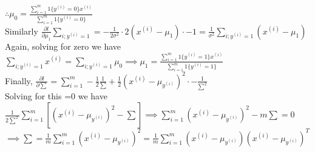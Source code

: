 \begin{answer}
$\therefore \mu_0=\frac{\sum_{i=1}^{m}1 \lbrace y^{(i)}=0 \rbrace x^{(i)}}{\sum_{i=1}^{m}1 \lbrace y^{(i)}=0 \rbrace}$\\
Similarly $\frac{\partial l}{\partial \mu_1}\sum_{i;y^{(i)}=1}=-\frac{1}{2 \sigma^2} \cdot 2 (x^{(i)}-\mu_1) \cdot -1=\frac{1}{\sigma^2}\sum_{i;y^{(i)}=1}(x^{(i)}-\mu_1)$\\
Again, solving for zero we have $\sum_{i;y^{(i)}=1}x^{(i)}=\sum_{i;y^{(i)}=1}\mu_0 \implies \mu_1=\frac{\sum_{i=1}^{m}1 \lbrace y^{(i)}=1 \rbrace x^{(i)}}{\sum_{i=1}^{m}1 \lbrace y^{(i)}=1 \rbrace}$\\
Finally, $\frac{\partial l}{\partial \sum}=\sum_{i=1}^{m}-\frac{1}{2}\frac{1}{\sum}+\frac{1}{2}(x^{(i)}-\mu_{y^{(i)}})^2 \cdot -\frac{1}{\sum^2}$\\
Solving for this =0 we have\\
$\frac{1}{2 \sum^2}\sum_{i=1}^{m} [(x^{(i)}-\mu_{y^{(i)}})^2 -\sum] \implies \sum_{i=1}^{m} (x^{(i)}-\mu_{y^{(i)}})^2 - m \sum=0 $\\
$\implies \sum=\frac{1}{m}\sum_{i=1}^{m} (x^{(i)}-\mu_{y^{(i)}})^2=\frac{1}{m}\sum_{i=1}^{m} (x^{(i)}-\mu_{y^{(i)}})(x^{(i)}-\mu_{y^{(i)}})^T$\\
\end{answer}
